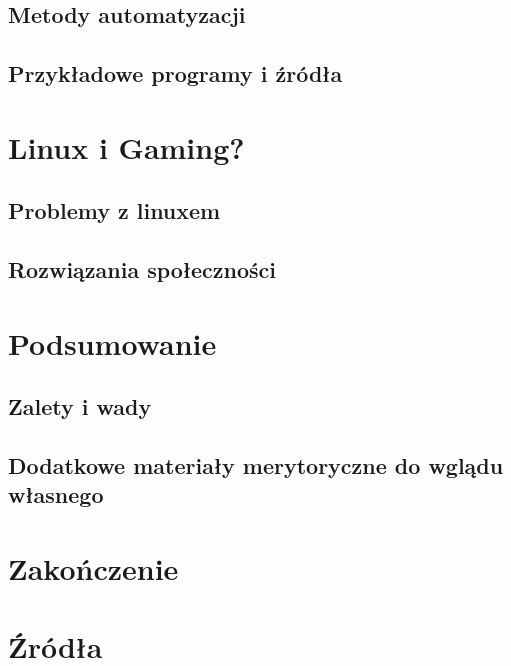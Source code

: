 \documentclass[10pt,a4paper]{report}
\begin{document}
	\section{Metody automatyzacji}
	
	\section{Przykładowe programy i źródła}
	
\chapter{Linux i Gaming?}

	\section{Problemy z linuxem}
	
	\section{Rozwiązania społeczności}
	

	
\chapter{Podsumowanie}

	\section{Zalety i wady}
	
	\section{Dodatkowe materiały merytoryczne do wglądu własnego}
	
\chapter{Zakończenie}
\newpage \newpage
\chapter{Źródła}
\end{document}
